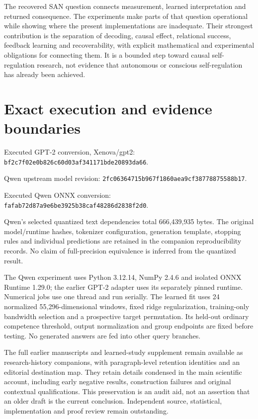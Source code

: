 \documentclass[11pt,letterpaper]{article}
\begin{document}
The recovered SAN question connects measurement, learned interpretation and returned consequence. The experiments make parts of that question operational while showing where the present implementations are inadequate. Their strongest contribution is the separation of decoding, causal effect, relational success, feedback learning and recoverability, with explicit mathematical and experimental obligations for connecting them. It is a bounded step toward causal self-regulation research, not evidence that autonomous or conscious self-regulation has already been achieved.

\appendix
\section{Exact execution and evidence boundaries}

Executed GPT-2 conversion, Xenova/gpt2: \texttt{bf2c7f02\allowbreak{}e0b826c6\allowbreak{}0d03af34\allowbreak{}1171bde2\allowbreak{}0893da66}.

Qwen upstream model revision: \texttt{2fc06364\allowbreak{}715b967f\allowbreak{}1860aea9\allowbreak{}cf387788\allowbreak{}75588b17}.

Executed Qwen ONNX conversion: \texttt{fafab72d\allowbreak{}87a9e6be\allowbreak{}3925b38c\allowbreak{}af48286d\allowbreak{}2838f2d0}.

Qwen's selected quantized text dependencies total 666,439,935 bytes. The original model/runtime hashes, tokenizer configuration, generation template, stopping rules and individual predictions are retained in the companion reproducibility records. No claim of full-precision equivalence is inferred from the quantized result.

The Qwen experiment uses Python 3.12.14, NumPy 2.4.6 and isolated ONNX Runtime 1.29.0; the earlier GPT-2 adapter uses its separately pinned runtime. Numerical jobs use one thread and run serially. The learned fit uses 24 normalized 55,296-dimensional windows, fixed ridge regularization, training-only bandwidth selection and a prospective target permutation. Its held-out ordinary competence threshold, output normalization and group endpoints are fixed before testing. No generated answers are fed into other query branches.

The full earlier manuscripts and learned-study supplement remain available as research-history companions, with paragraph-level retention identities and an editorial destination map. They retain details condensed in the main scientific account, including early negative results, construction failures and original contextual qualifications. This preservation is an audit aid, not an assertion that an older draft is the current conclusion. Independent source, statistical, implementation and proof review remain outstanding.
\end{document}

